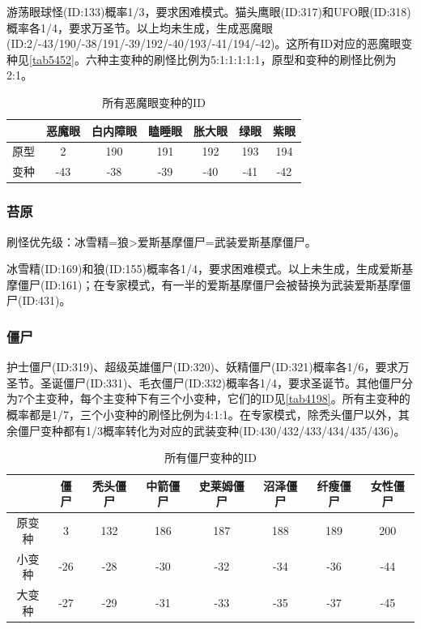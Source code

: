 游荡眼球怪(ID:133)概率1/3，要求困难模式。猫头鹰眼(ID:317)和UFO眼(ID:318)概率各1/4，要求万圣节。以上均未生成，生成恶魔眼(ID:2/-43/190/-38/191/-39/192/-40/193/-41/194/-42)。这所有ID对应的恶魔眼变种见\autoref{tab5452}。六种主变种的刷怪比例为5:1:1:1:1:1，原型和变种的刷怪比例为2:1。

\begin{table}[!h]
    \centering
    \begin{tabular}{c|cccccc}
         &恶魔眼&白内障眼&瞌睡眼&胀大眼&绿眼&紫眼\\\hline
         原型&2&190&191&192&193&194\\
         变种&-43&-38&-39&-40&-41&-42
    \end{tabular}
    \caption{所有恶魔眼变种的ID}
    \label{tab5452}
\end{table}

\subsubsection{苔原}\label{app16}
刷怪优先级：冰雪精=狼>爱斯基摩僵尸=武装爱斯基摩僵尸。

冰雪精(ID:169)和狼(ID:155)概率各1/4，要求困难模式。以上未生成，生成爱斯基摩僵尸(ID:161)；在专家模式，有一半的爱斯基摩僵尸会被替换为武装爱斯基摩僵尸(ID:431)。

\subsubsection{僵尸}\label{app17}
护士僵尸(ID:319)、超级英雄僵尸(ID:320)、妖精僵尸(ID:321)概率各1/6，要求万圣节。圣诞僵尸(ID:331)、毛衣僵尸(ID:332)概率各1/4，要求圣诞节。其他僵尸分为7个主变种，每个主变种下有三个小变种，它们的ID见\autoref{tab4198}。所有主变种的概率都是1/7，三个小变种的刷怪比例为4:1:1。在专家模式，除秃头僵尸以外，其余僵尸变种都有1/3概率转化为对应的武装变种(ID:430/432/433/434/435/436)。

\begin{table}[!h]
    \centering
    \begin{tabular}{c|ccccccc}
         &僵尸&秃头僵尸&中箭僵尸&史莱姆僵尸&沼泽僵尸&纤瘦僵尸&女性僵尸\\\hline
         原变种&3  &132&186&187&188&189&200\\
         小变种&-26&-28&-30&-32&-34&-36&-44\\
         大变种&-27&-29&-31&-33&-35&-37&-45
    \end{tabular}
    \caption{所有僵尸变种的ID}
    \label{tab4198}
\end{table}

